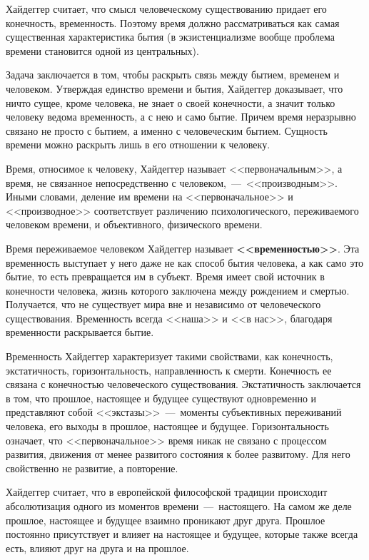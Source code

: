 \documentclass{bmstu}
\begin{document}
Хайдеггер считает, что смысл человеческому существованию придает его конечность, временность. Поэтому время должно рассматриваться как самая существенная характеристика бытия (в экзистенциализме вообще проблема времени становится одной из центральных).

Задача заключается в том, чтобы раскрыть связь между бытием, временем и человеком. Утверждая единство времени и бытия, Хайдеггер доказывает, что ничто сущее, кроме человека, не знает о своей конечности, а значит только человеку ведома временность, а с нею и само бытие. Причем время неразрывно связано не просто с бытием, а именно с человеческим бытием. Сущность времени можно раскрыть лишь в его отношении к человеку.

Время, относимое к человеку, Хайдеггер называет <<первоначальным>>, а время, не связанное непосредственно с человеком,~---~<<производным>>. Иными словами, деление им времени на <<первоначальное>> и <<производное>> соответствует различению психологического, переживаемого человеком времени, и объективного, физического времени.

Время переживаемое человеком Хайдеггер называет 
\textbf{<<временностью>>}. Эта временность выступает у него даже не как способ бытия человека, а как само это бытие, то есть превращается им в субъект. Время имеет свой источник в конечности человека, жизнь которого заключена между рождением и смертью. Получается, что не существует мира вне и независимо от человеческого существования. Временность всегда <<наша>> и <<в нас>>, благодаря временности раскрывается бытие.

Временность Хайдеггер характеризует такими свойствами, как конечность, экстатичность, горизонтальность, направленность к смерти. Конечность ее связана с конечностью человеческого существования. Экстатичность заключается в том, что прошлое, настоящее и будущее существуют одновременно и представляют собой <<экстазы>>~---~моменты субъективных переживаний человека, его выходы в прошлое, настоящее и будущее. Горизонтальность означает, что <<первоначальное>> время никак не связано с процессом развития, движения от менее развитого состояния к более развитому. Для него свойственно не развитие, а повторение.

Хайдеггер считает, что в европейской философской традиции происходит абсолютизация одного из моментов времени~---~настоящего. На самом же деле прошлое, настоящее и будущее взаимно проникают друг друга. Прошлое постоянно присутствует и влияет на настоящее и будущее, которые также всегда есть, влияют друг на друга и на прошлое.
\end{document}
